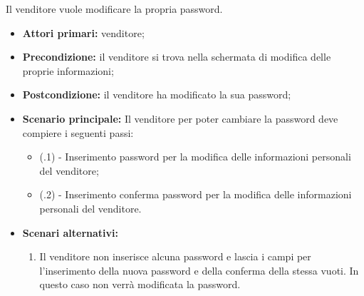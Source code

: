 Il venditore vuole modificare la propria password.
\begin{itemize}
    \item \textbf{Attori primari:} venditore;
    \item \textbf{Precondizione:} il venditore si trova nella schermata di modifica delle proprie informazioni;
    \item \textbf{Postcondizione:} il venditore ha modificato la sua password;
    \item \textbf{Scenario principale:} Il venditore per poter cambiare la password deve compiere i seguenti passi:
        \begin{itemize}
            \item (\actualSubUC.1) - Inserimento password per la modifica delle informazioni personali del venditore;
            \item (\actualSubUC.2) - Inserimento conferma password per la modifica delle informazioni personali del venditore.
        \end{itemize}
    \item \textbf{Scenari alternativi:}
    \begin{enumerate}[label=\lett]
    	\item Il venditore non inserisce alcuna password e lascia i campi per l'inserimento della nuova password e della conferma della stessa vuoti. In questo caso non verrà modificata la password.
    \end{enumerate}
\end{itemize}

\resetSubSubUC

